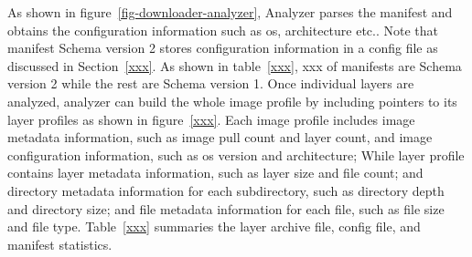 As shown in figure~\ref{fig-downloader-analyzer}, Analyzer parses the manifest
and obtains the configuration information such as os, architecture etc..
%
Note that manifest Schema version 2 stores configuration information in a
config file as discussed in Section~\ref{xxx}.
%
As shown in table~\ref{xxx}, xxx of manifests are Schema version 2 while the
rest are Schema version 1. 
%
Once individual layers are analyzed, analyzer can build the whole image
profile by including pointers to its layer profiles as shown in
figure~\ref{xxx}. Each image profile includes image metadata information,
such as image pull count and layer count, and image configuration
information, such as os version and architecture; While layer profile
contains layer metadata information, such as layer size and file count;
and directory metadata information for each subdirectory, such as directory
depth and directory size; and file metadata information for each file, such
as file size and file type.
%
Table~\ref{xxx} summaries the layer archive file, config file, and manifest
statistics.




